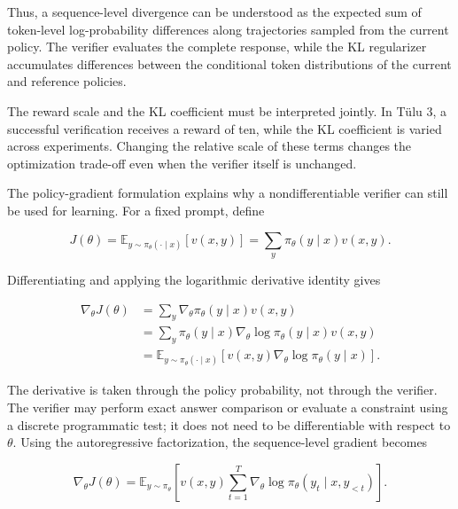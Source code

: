 Thus, a sequence-level divergence can be understood as the expected sum of
token-level log-probability differences along trajectories sampled from the
current policy. The verifier evaluates the complete response, while the KL
regularizer accumulates differences between the conditional token
distributions of the current and reference policies.

The reward scale and the KL coefficient must be interpreted jointly. In
Tülu 3, a successful verification receives a reward of ten, while the KL
coefficient is varied across experiments. Changing the relative scale of
these terms changes the optimization trade-off even when the verifier itself
is unchanged.

The policy-gradient formulation explains why a nondifferentiable verifier
can still be used for learning. For a fixed prompt, define

\begin{equation}
    J(\theta)
    =
    \mathbb{E}_{y\sim\pi_\theta(\cdot\mid x)}
    [v(x,y)]
    =
    \sum_y \pi_\theta(y\mid x)v(x,y).
    \label{eq:rlvr-policy-gradient-start}
\end{equation}

Differentiating and applying the logarithmic derivative identity gives

\begin{align}
    \nabla_\theta J(\theta)
    &=
    \sum_y
    \nabla_\theta\pi_\theta(y\mid x)v(x,y)
    \nonumber\\
    &=
    \sum_y
    \pi_\theta(y\mid x)
    \nabla_\theta\log\pi_\theta(y\mid x)
    v(x,y)
    \nonumber\\
    &=
    \mathbb{E}_{y\sim\pi_\theta(\cdot\mid x)}
    \left[
        v(x,y)\nabla_\theta\log\pi_\theta(y\mid x)
    \right].
    \label{eq:rlvr-score-function-gradient}
\end{align}

The derivative is taken through the policy probability, not through the
verifier. The verifier may perform exact answer comparison or evaluate a
constraint using a discrete programmatic test; it does not need to be
differentiable with respect to \(\theta\). Using the autoregressive
factorization, the sequence-level gradient becomes

\begin{equation}
    \nabla_\theta J(\theta)
    =
    \mathbb{E}_{y\sim\pi_\theta}
    \left[
        v(x,y)
        \sum_{t=1}^{T}
        \nabla_\theta
        \log\pi_\theta(y_t\mid x,y_{<t})
    \right].
    \label{eq:rlvr-token-policy-gradient}
\end{equation}

